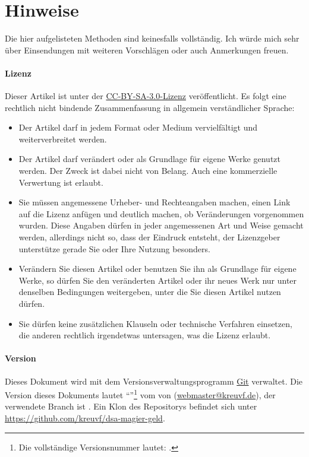 \section{Hinweise}
Die hier aufgelisteten Methoden sind keinesfalls vollständig. Ich würde mich sehr über Einsendungen mit weiteren Vorschlägen oder auch Anmerkungen freuen.
\paragraph{Lizenz}
Dieser Artikel ist unter der \href{https://creativecommons.org/licenses/by-sa/3.0/de/}{CC-BY-SA-3.0-Lizenz} veröffentlicht. Es folgt eine rechtlich nicht bindende Zusammenfassung in allgemein verständlicher Sprache:
\begin{itemize}
	\item Der Artikel darf in jedem Format oder Medium vervielfältigt und weiterverbreitet werden.
	\item Der Artikel darf verändert oder als Grundlage für eigene Werke genutzt werden. Der Zweck ist dabei nicht von Belang. Auch eine kommerzielle Verwertung ist erlaubt.
	\item Sie müssen angemessene Urheber- und Rechteangaben machen, einen Link auf die Lizenz anfügen und deutlich machen, ob Veränderungen vorgenommen wurden. Diese Angaben dürfen in jeder angemessenen Art und Weise gemacht werden, allerdings nicht so, dass der Eindruck entsteht, der Lizenzgeber unterstütze gerade Sie oder Ihre Nutzung besonders.
	\item Verändern Sie diesen Artikel oder benutzen Sie ihn als Grundlage für eigene Werke, so dürfen Sie den veränderten Artikel oder ihr neues Werk nur unter denselben Bedingungen weitergeben, unter die Sie diesen Artikel nutzen dürfen.
	\item Sie dürfen keine zusätzlichen Klauseln oder technische Verfahren einsetzen, die anderen rechtlich irgendetwas untersagen, was die Lizenz erlaubt.
\end{itemize}

\paragraph{Version}
Dieses Dokument wird mit dem Versionsverwaltungsprogramm \href{https://git-scm.com/}{Git} verwaltet. Die Version dieses Dokuments lautet \enquote{\gitAbbrevHash{}}\footnote{Die vollständige Versionsnummer lautet: \gitHash{}.} vom \gitAuthorIsoDate{} von \gitAuthorName{} (\href{mailto:webmaster@kreuvf.de}{webmaster@kreuvf.de}), der verwendete Branch ist \gitBranch. Ein Klon des Repositorys befindet sich unter \url{https://github.com/kreuvf/dsa-magier-geld}.
